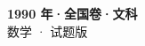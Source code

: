 \documentclass[zihao=-4, a4paper]{ctexart}
\begin{document}
\begin{center}
  {\Large\bfseries 1990 年·全国卷·文科}\\[4pt]
  {\large 数学 · 试题版}
\end{center}
\medskip
{}

\end{document}

